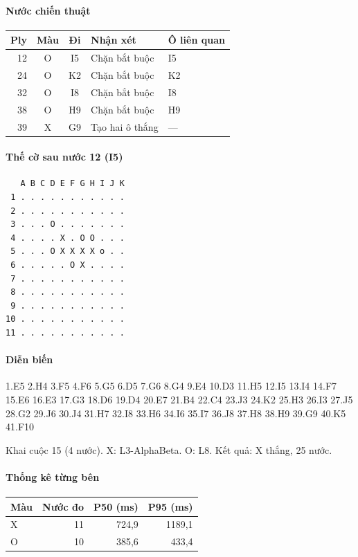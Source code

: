\paragraph{Nước chiến thuật}
\begin{center}\small
\begin{tabular}{@{}rccll@{}}
\toprule
Ply & Màu & Đi & Nhận xét & Ô liên quan \\
\midrule
12 & O & I5 & Chặn bắt buộc & I5 \\
24 & O & K2 & Chặn bắt buộc & K2 \\
32 & O & I8 & Chặn bắt buộc & I8 \\
38 & O & H9 & Chặn bắt buộc & H9 \\
39 & X & G9 & Tạo hai ô thắng & — \\
\bottomrule
\end{tabular}
\end{center}
\paragraph{Thế cờ sau nước 12 (I5)}
\begin{verbatim}
   A B C D E F G H I J K
 1 . . . . . . . . . . .
 2 . . . . . . . . . . .
 3 . . . O . . . . . . .
 4 . . . . X . O O . . .
 5 . . . O X X X X o . .
 6 . . . . . O X . . . .
 7 . . . . . . . . . . .
 8 . . . . . . . . . . .
 9 . . . . . . . . . . .
10 . . . . . . . . . . .
11 . . . . . . . . . . .
\end{verbatim}
\paragraph{Diễn biến}
{\footnotesize 1.E5 2.H4 3.F5 4.F6 5.G5 6.D5 7.G6 8.G4 9.E4 10.D3 11.H5 12.I5 13.I4 14.F7 15.E6 16.E3 17.G3 18.D6 19.D4 20.E7 21.B4 22.C4 23.J3 24.K2 25.H3 26.I3 27.J5 28.G2 29.J6 30.J4 31.H7 32.I8 33.H6 34.I6 35.I7 36.J8 37.H8 38.H9 39.G9 40.K5 41.F10\par}
Khai cuộc 15 (4 nước). X: L3-AlphaBeta. O: L8. Kết quả: X thắng, 25 nước.
\paragraph{Thống kê từng bên}
\begin{center}\small
\begin{tabular}{@{}lrrr@{}}
\toprule
Màu & Nước đo & P50 (ms) & P95 (ms) \\
\midrule
X & 11 & 724,9 & 1189,1 \\
O & 10 & 385,6 & 433,4 \\
\bottomrule
\end{tabular}
\end{center}
